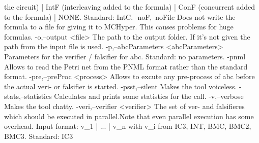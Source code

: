                                       the circuit)  | IntF (interleaving
                                      added to the formula)  | ConF
                                      (concurrent added to the formula)  |
                                      NONE. Standard: IntC.
 -noF,--noFile                        Does not write the formula to a file
                                      for giving it to MCHyper. This
                                      causes problems for huge formulas.
 -o,--output <file>                   The path to the output folder. If
                                      it's not given the path from the
                                      input file is used.
 -p,--abcParameters <abcParameters>   Parameters for the verifier /
                                      falsifier for abc. Standard: no
                                      parameters.
 -pnml                                Allows to read the Petri net from
                                      the PNML format rather than the
                                      standard format.
 -pre,--preProc <process>             Allows to excute any pre-process of
                                      abc before the actual veri- or
                                      falsifier is started.
 -psst,--silent                       Makes the tool voiceless.
 -stats,--statistics                  Calculates and prints some
                                      statistics for the call.
 -v,--verbose                         Makes the tool chatty.
 -veri,--verifier <verifier>          The set of ver- and falsifieres
                                      which should be executed in
                                      parallel.Note that even parallel
                                      execution has some overhead. Input
                                      format: v_1 | ... | v_n with v_i
                                      from {IC3, INT, BMC, BMC2, BMC3}.
                                      Standard: IC3
